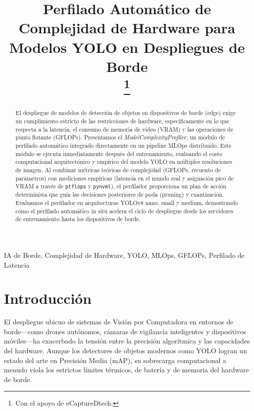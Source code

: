 \documentclass[conference]{IEEEtran}
\begin{document}
\title{Perfilado Automático de Complejidad de Hardware para Modelos YOLO en Despliegues de Borde\\
\thanks{Con el apoyo de eCaptureDtech.}
}

\author{
}

\maketitle

\begin{abstract}
El despliegue de modelos de detección de objetos en dispositivos de borde (edge) exige un cumplimiento estricto de las restricciones de hardware, específicamente en lo que respecta a la latencia, el consumo de memoria de video (VRAM) y las operaciones de punto flotante (GFLOPs). Presentamos el \textit{ModelComplexityProfiler}, un módulo de perfilado automático integrado directamente en un pipeline MLOps distribuido. Este módulo se ejecuta inmediatamente después del entrenamiento, evaluando el costo computacional arquitectónico y empírico del modelo YOLO en múltiples resoluciones de imagen. Al combinar métricas teóricas de complejidad (GFLOPs, recuento de parámetros) con mediciones empíricas (latencia en el mundo real y asignación pico de VRAM a través de \texttt{ptflops} y \texttt{pynvml}), el perfilador proporciona un plan de acción determinista que guía las decisiones posteriores de poda (pruning) y cuantización. Evaluamos el perfilador en arquitecturas YOLOv8 nano, small y medium, demostrando cómo el perfilado automático in situ acelera el ciclo de despliegue desde los servidores de entrenamiento hasta los dispositivos de borde.
\end{abstract}

\begin{IEEEkeywords}
IA de Borde, Complejidad de Hardware, YOLO, MLOps, GFLOPs, Perfilado de Latencia
\end{IEEEkeywords}

\section{Introducción}
El despliegue ubicuo de sistemas de Visión por Computadora en entornos de borde—como drones autónomos, cámaras de vigilancia inteligentes y dispositivos móviles—ha exacerbado la tensión entre la precisión algorítmica y las capacidades del hardware. Aunque los detectores de objetos modernos como YOLO logran un estado del arte en Precisión Media (mAP), su sobrecarga computacional a menudo viola los estrictos límites térmicos, de batería y de memoria del hardware de borde.
\end{document}
